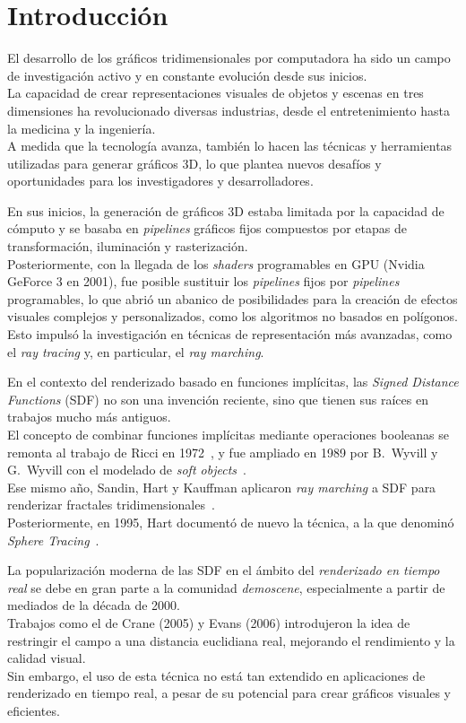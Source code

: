 \chapter{Introducción}
El desarrollo de los gráficos tridimensionales por computadora ha sido un campo de investigación activo y en constante evolución desde sus inicios.\\
La capacidad de crear representaciones visuales de objetos y escenas en tres dimensiones ha revolucionado diversas industrias, desde el entretenimiento hasta la medicina y la ingeniería.\\
A medida que la tecnología avanza, también lo hacen las técnicas y herramientas utilizadas para generar gráficos 3D, lo que plantea nuevos desafíos y oportunidades para los investigadores y desarrolladores.

En sus inicios, la generación de gráficos 3D estaba limitada por la capacidad de cómputo y se basaba en \textit{pipelines} gráficos fijos compuestos por etapas de transformación, iluminación y rasterización.\\
Posteriormente, con la llegada de los \textit{shaders} programables en GPU (Nvidia GeForce 3 en 2001), fue posible sustituir los \textit{pipelines} fijos por \textit{pipelines} programables, lo que abrió un abanico de posibilidades para la creación de efectos visuales complejos y personalizados, como los algoritmos no basados en polígonos.\\
Esto impulsó la investigación en técnicas de representación más avanzadas, como el \textit{ray tracing} y, en particular, el \textit{ray marching}.

En el contexto del renderizado basado en funciones implícitas, las \textit{Signed Distance Functions} (SDF) no son una invención reciente, sino que tienen sus raíces en trabajos mucho más antiguos.\\
El concepto de combinar funciones implícitas mediante operaciones booleanas se remonta al trabajo de Ricci en 1972~\cite{Ricci:1973:CGC}, y fue ampliado en 1989 por B.~Wyvill y G.~Wyvill con el modelado de \textit{soft objects}~\cite{wyvill1989}.\\
Ese mismo año, Sandin, Hart y Kauffman aplicaron \textit{ray marching} a SDF para renderizar fractales tridimensionales~\cite{hart1989ray}.\\
Posteriormente, en 1995, Hart documentó de nuevo la técnica, a la que denominó \textit{Sphere Tracing}~\cite{hart1996}.

La popularización moderna de las SDF en el ámbito del \textit{renderizado en tiempo real} se debe en gran parte a la comunidad \textit{demoscene}, especialmente a partir de mediados de la década de 2000.\\
Trabajos como el de Crane (2005) y Evans (2006) introdujeron la idea de restringir el campo a una distancia euclidiana real, mejorando el rendimiento y la calidad visual.\\
Sin embargo, el uso de esta técnica no está tan extendido en aplicaciones de renderizado en tiempo real, a pesar de su potencial para crear gráficos visuales y eficientes.
